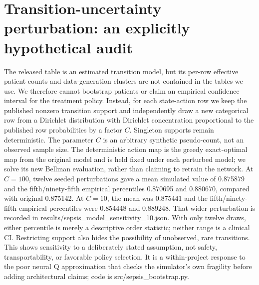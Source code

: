 \section{Transition-uncertainty perturbation: an explicitly hypothetical audit}
The released table is an estimated transition model, but its per-row effective patient counts and data-generation clusters are not contained in the tables we use. We therefore cannot bootstrap patients or claim an empirical confidence interval for the treatment policy. Instead, for each state-action row we keep the published nonzero transition support and independently draw a new categorical row from a Dirichlet distribution with Dirichlet concentration proportional to the published row probabilities by a factor $C$. Singleton supports remain deterministic. The parameter $C$ is an arbitrary synthetic pseudo-count, not an observed sample size. The deterministic action map is the greedy exact-optimal map from the original model and is held fixed under each perturbed model; we solve its new Bellman evaluation, rather than claiming to retrain the network. At $C=100$, twelve seeded perturbations gave a mean simulated value of 0.875879 and the fifth/ninety-fifth empirical percentiles 0.870695 and 0.880670, compared with original 0.875142. At $C=10$, the mean was 0.875441 and the fifth/ninety-fifth empirical percentiles were 0.854448 and 0.889248. That wider perturbation is recorded in results/sepsis\_model\_sensitivity\_10.json. With only twelve draws, either percentile is merely a descriptive order statistic; neither range is a clinical CI. Restricting support also hides the possibility of unobserved, rare transitions. This shows sensitivity to a deliberately stated assumption, not safety, transportability, or favorable policy selection. It is a within-project response to the poor neural Q approximation that checks the simulator's own fragility before adding architectural claims; code is src/sepsis\_bootstrap.py.

